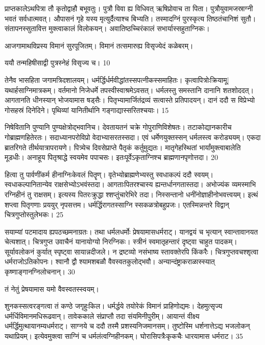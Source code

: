   प्राप्तकालेऽथपित्रा तौ कृतोद्वाहौ बभूवतुः।
 पुत्रौ विवा ह्य विधिवत् ऋषिप्रोवाच ता पिता।
 पुत्रौयुवामजस्राग्नी भवतं सर्वधात्मवत्।
 औपासनं गृहे यस्य मृत्युर्दैत्याश्च बिभ्यति।
 तस्मादग्निं पुरस्कृत्य तिष्ठतंचानिशं सुतौ।
 संतापनस्सुतावित्त मुक्त्वाकालं विलोकयन्।
 अवातिष्ठच्चिरंकालं सभार्यास्सहुताग्निकः।
 
आजगामाथविप्रस्य विमानं सुरपूजितम्।
 विमानं तत्समारुह्य विसृज्येदं कळेबरम्।
 
ययौ तन्महिषीसाद्वी पुत्रस्नेहं विसृज्य च।
 10

  तेनैव भासहिता जगामत्रिदशालयम्।
 धर्मर्द्धिर्धर्मवीद्धांतस्सपत्नीकस्समाहितः।
 कृत्वापित्रोःक्रियामू| यथार्हसाग्निमात्रकम्।
 वर्तमानो निजेधर्मे तपस्वीस्वाश्रमेऽवसत्।
 धर्मलस्तु समस्तानि दानानि शतशोददत्।
 आगतानति धीनस्यान् भोजयामास षड्सैः।
 पितृभ्यामार्जितंद्रव्यं सत्वास्ते प्रतिपादयन्।
 दानं ददौ स विप्रेभ्यो गोसहस्रं दिनेदिने।
 पृथिव्यां यानितीर्थानि गङ्गाद्यास्सरितश्चयाः।
 15

  निषेवितानि पुण्यानि पुण्यक्षेत्रोद्भवानिच।
 देवतायतनं चक्रे गोपुराणिविशेषतः।
 तटाकोद्यानकारीच गोब्राह्मणहितेरतः।
 सदाध्यानपरोविप्रो वेदाभ्यासरतस्सदा।
 एवं धर्मेणयुक्तस्सन् धर्मलस्त्व करोड्ययम्।
 एकदा ब्रातरिगते तीर्थयात्रापरायणे।
 पित्र्येच दिवसेप्राप्ते पैतृकं कर्तुमुद्यतः।
 मातृगेहस्थितां भार्यांमुक्त्वाबालेति मूडधीः।
 अनाहूय पितृश्राद्धे स्वयमेव पपाचसः।
 इतःपूर्वेऽकृताग्निश्च ब्राह्मणानपृणोत्तदा।
 20

 
हित्वा तु पार्वणींकर्म हीनाग्निःकेवलं पितॄण्।
 वृतेभ्योब्राह्मणेभ्यस्तु स्वधाकल्पं ददौ स्वयम्।
 स्वधाकल्पानितान्येव राक्षसेभ्योऽभवंस्तदा।
 आगताःपितरश्चास्य ह्यन्तर्धानगतास्तदा।
 अभोज्यंक व्यमस्माभि रग्निहीनं तु राक्षसम्।
 इत्यस्य पितरःक्रुद्धा श्शप्तुंचारेभिरे तदा।
 निस्सन्तानो धनींनोज्ञाहीनोभवत्त्वयम्।
 इत्थं शप्त्वा पितृगणाः प्रययुर् नृपसत्तम।
 धर्मर्द्धिरागतस्साग्नि स्सकळत्रोबहुप्रजः।
 एतस्मिन्नन्तरे विद्वान् चित्रगुप्तोस्तुलेभकः।
 25

  सयाम्यां पटमादाय ह्यपठच्छमनाग्रतः।
 तथा धर्मलधर्मोः प्रेषयामासधर्मराट्।
 यानद्वयं च भृत्यान् स्वान्तावानयत चेत्यशात्।
 चित्रगुप्त उवाचैनं यानायोग्यो निरग्निकः।
 स्त्रीनं स्वमातृहन्तारं दृष्ट्वा चाहुत पादकम्।
 सूर्यावलोकनं कुर्यात् स्पृष्ट्वा सायान्नदीजले।
 न द्रष्टव्यो नसंभाष्य स्तावक्तेरपि किंकरैः।
 चित्रगुप्तवचश्शृत्वा धर्मराजोऽतिकोपनः।
 श्वानौ द्वौ श्यामशबळौ वैवस्वतकुलोद्भवौ।
 अन्यान्दंष्ट्राकराळास्स्यात्
कृष्णाङ्गानग्निलोचनान्।
 30

  तं नेतुं प्रेषयामास यमो वैवस्वतस्स्वयम्।
 
शुनकस्सत्वरङ्गत्वा तं कण्ठे जगृहुःकिल।
 धर्मर्द्धये तयोरेकं विमानं प्राहिणोद्यमः।
 देहमुत्सृज्य धर्मर्धिविमानमधिरूढवान्।
 तावेककाले संप्राप्तौ तदा संयमिनीपुरीम्।
 आयान्तं वीक्ष्य धर्मर्द्धिमुत्थायानम्यधर्मराट्।
 साग्नये च ददौ तस्मै प्रशस्यनिजमानसम्।
 तुष्टोस्मि धर्शनात्तेऽद्य भजलोकन् यथाप्रियम्।
 इत्येवमुक्त्वा साग्निं च धर्मलंत्वग्निहीनकम्।
 घोरासिपत्रैःकृकचैः धारयामास धर्मराट।
 35

